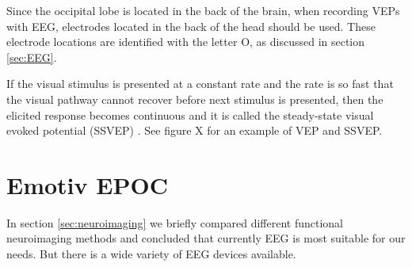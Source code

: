 Since the occipital lobe is located in the back of the brain, when recording VEPs with EEG, electrodes located in the back of the head should be used. These electrode locations are identified with the letter O, as discussed in section \ref{sec:EEG}.

If the visual stimulus is presented at a constant rate and the rate is so fast that the visual pathway cannot recover before next stimulus is presented, then the elicited response becomes continuous and it is called the steady-state visual evoked potential (SSVEP) \cite{VEP}. See figure X for an example of VEP and SSVEP.

\section{Emotiv EPOC}

In section \ref{sec:neuroimaging} we briefly compared different functional neuroimaging methods and concluded that currently \acrshort{EEG} is most suitable for our needs. But there is a wide variety of EEG devices available. 
 